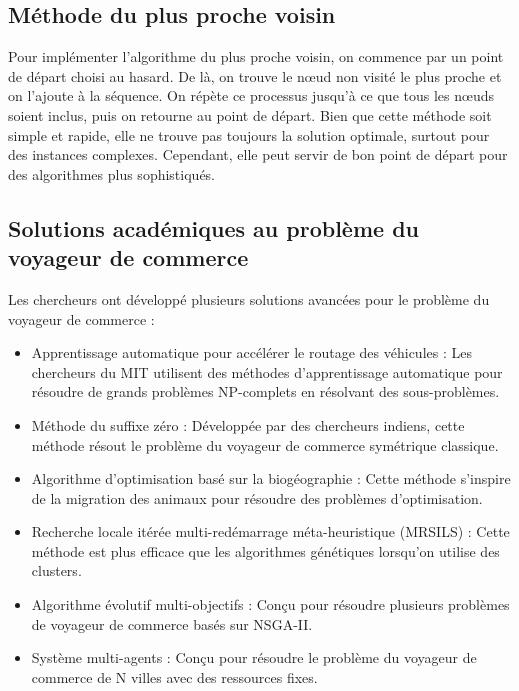 \documentclass{article}
\begin{document}
\subsection{Méthode du plus proche voisin}

Pour implémenter l'algorithme du plus proche voisin, on commence par un point de départ choisi au hasard.
De là, on trouve le nœud non visité le plus proche et on l'ajoute à la séquence.
On répète ce processus jusqu'à ce que tous les nœuds soient inclus, puis on retourne au point de départ.
Bien que cette méthode soit simple et rapide, elle ne trouve pas toujours la solution optimale, surtout pour des instances complexes.
Cependant, elle peut servir de bon point de départ pour des algorithmes plus sophistiqués.

\subsection{Solutions académiques au problème du voyageur de commerce}

Les chercheurs ont développé plusieurs solutions avancées pour le problème du voyageur de commerce :

\begin{itemize}
    \item Apprentissage automatique pour accélérer le routage des véhicules : Les chercheurs du MIT utilisent des méthodes d'apprentissage automatique pour résoudre de grands problèmes NP-complets en résolvant des sous-problèmes\cite{li2021learningdelegatelargescalevehicle}.
    
    \item Méthode du suffixe zéro : Développée par des chercheurs indiens, cette méthode résout le problème du voyageur de commerce symétrique classique\cite{Sudhakar2011ANA}.
    
    \item Algorithme d'optimisation basé sur la biogéographie : Cette méthode s'inspire de la migration des animaux pour résoudre des problèmes d'optimisation\cite{mo2011biogeography}.
    
    \item Recherche locale itérée multi-redémarrage méta-heuristique (MRSILS) : Cette méthode est plus efficace que les algorithmes génétiques lorsqu'on utilise des clusters\cite{10.1371/journal.pone.0201868}.
    
    \item Algorithme évolutif multi-objectifs : Conçu pour résoudre plusieurs problèmes de voyageur de commerce basés sur NSGA-II\cite{doi:10.1080/21642583.2019.1674220}.
    
    \item Système multi-agents : Conçu pour résoudre le problème du voyageur de commerce de N villes avec des ressources fixes\cite{8789895}.
\end{itemize}
\end{document}
